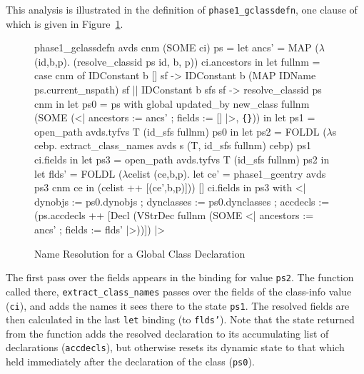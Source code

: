 \documentclass[11pt]{article}
\newcommand{\lbr}{\texttt{\{}}
\newcommand{\rbr}{\texttt{\}}}
\begin{document}
This analysis is illustrated in the definition of
\texttt{phase1_gclassdefn}, one clause of which is given in
Figure~\ref{fig:phase1-gclassdefn}.
\begin{figure}[htbp]
\begin{stdrule}
   phase1_gclassdefn avds cnm (SOME ci) ps =
     let ancs' = MAP (\(\lambda\)(id,b,p). (resolve_classid ps id, b, p))
                     ci.ancestors in
     let fullnm =
           case cnm of
              IDConstant b [] sf ->
                 IDConstant b (MAP IDName ps.current_nspath) sf
           || IDConstant b sfs sf -> resolve_classid ps cnm in
     let ps0 = ps with global updated_by
                 new_class fullnm
                           (SOME (<| ancestors := ancs' ;
                                     fields := [] |>, \lbr\rbr)) in
     let ps1 = open_path avds.tyfvs T (id_sfs fullnm) ps0 in
     let ps2 = FOLDL (\(\lambda\)s cebp.
                        extract_class_names avds s
                           (T, id_sfs fullnm) cebp)
                     ps1
                     ci.fields in
     let ps3 = open_path avds.tyfvs T (id_sfs fullnm) ps2 in
     let flds' =
         FOLDL (\(\lambda\)celist (ce,b,p).
                  let ce' = phase1_gcentry avds ps3 cnm ce
                  in
                    (celist ++ [(ce',b,p)]))
               []
               ci.fields
     in
       ps3 with <|
         dynobjs := ps0.dynobjs ;
         dynclasses := ps0.dynclasses ;
         accdecls :=
           (ps.accdecls ++
            [Decl (VStrDec fullnm
                     (SOME <| ancestors := ancs' ;
                              fields := flds' |>))])
       |>
\end{stdrule}
\caption{Name Resolution for a Global Class Declaration}
\label{fig:phase1-gclassdefn}
\end{figure}
The first pass over the fields appears in the binding for value
\texttt{ps2}.  The function called there, \texttt{extract_class_names}
passes over the fields of the class-info value (\texttt{ci}), and adds
the names it sees there to the state \texttt{ps1}.  The resolved
fields are then calculated in the last \texttt{let} binding (to
\texttt{flds'}).  Note that the state returned from the function adds
the resolved declaration to its accumulating list of declarations
(\texttt{accdecls}), but otherwise resets its dynamic state to that
which held immediately after the declaration of the class
(\texttt{ps0}).
\end{document}
